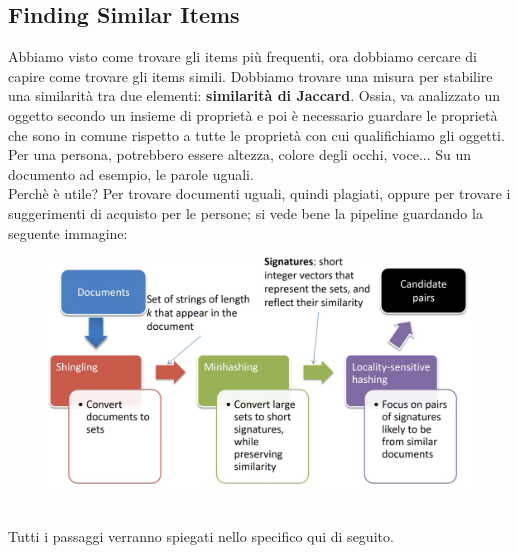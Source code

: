 \newpage

\subsection{Finding Similar Items}
Abbiamo visto come trovare gli items più frequenti, ora dobbiamo cercare di capire come trovare gli items simili. Dobbiamo trovare una misura per stabilire una similarità tra due elementi: \textbf{similarità di Jaccard}. Ossia, va analizzato un oggetto secondo un insieme di proprietà e poi è necessario guardare le proprietà che sono in comune rispetto a tutte le proprietà con cui qualifichiamo gli oggetti. Per una persona, potrebbero essere altezza, colore degli occhi, voce... Su un documento ad esempio, le parole uguali. 
\\
Perchè è utile? Per trovare documenti uguali, quindi plagiati, oppure per trovare i suggerimenti di acquisto per le persone; si vede bene la pipeline guardando la seguente immagine:
\\
\begin{figure}[th]
    \centering
    \includegraphics[scale=0.5]{FrequentItems/img/pipeline.png}
\end{figure}
\\
Tutti i passaggi verranno spiegati nello specifico qui di seguito. 

